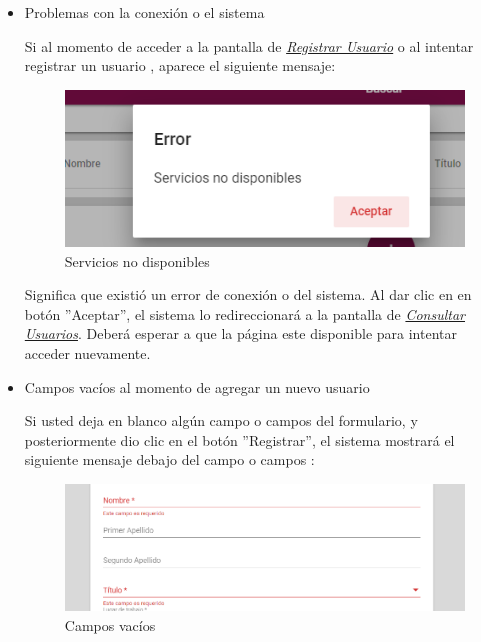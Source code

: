                 \begin{itemize}
                    \item Problemas con la conexión o el sistema

                        Si al momento de acceder a la pantalla de \hyperlink{registrarUs}{\textit{Registrar Usuario}} o al intentar registrar un usuario , aparece el siguiente mensaje:

                        \begin{figure}[!hbtp]
                      	\centering
                      	\includegraphics[width=0.4\linewidth]{images/SP5/MSGSN}
                      	\caption{Servicios no disponibles}
                      	\label{SND}

                      \end{figure}

                        Significa que existió un error de conexión o del sistema. Al dar clic en en botón ''Aceptar'', el sistema lo redireccionará a la pantalla de \hyperlink{consultarUs}{\textit{Consultar Usuarios}}. Deberá esperar a que la página este disponible para  intentar acceder nuevamente.

                    \item Campos vacíos al momento de agregar un nuevo usuario

                        Si usted deja en blanco algún campo o campos del formulario, y posteriormente dio clic en el botón ''Registrar'', el sistema mostrará el siguiente mensaje debajo del campo o campos :

                         \begin{figure}[!hbtp]
                        	\centering
                        \includegraphics[width=0.4\linewidth]{images/SP5/MSG44}
                        	\caption{Campos vacíos}
                        \label{mensaje44}
                       \end{figure}


\end{itemize}
